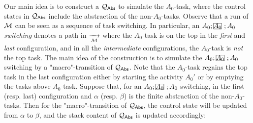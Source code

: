 Our main idea is to construct a {\WOTrPDS} ${\mathcal{Q} }_{{\mathsf{Abs} }}$ to simulate the $A_0$-task, where the control states in ${\mathcal{Q} }_{{\mathsf{Abs} }}$ include the abstraction of the non-$A_0$-tasks.
Observe that a run of ${\mathcal{M} }$ can be seen as a sequence of task switching. In particular, an $A_0;\mhcancel{A_0};A_0$ \emph{switching} denotes a path in $\xrightarrow[{\mathcal{M} }]{}$ where the $A_0$-task is on the top in the \emph{first} and \emph{last} configuration, and in all the \emph{intermediate} configurations, the $A_0$-task is \emph{not} the top task. The main idea of the construction is to simulate the $A_0;\mhcancel{A_0};A_0$ switching by a "macro"-transition of ${\mathcal{Q} }_{{\mathsf{Abs} }}$. Note that the $A_0$-task regains the top task in the last configuration either by starting the activity $A_0'$ or by emptying the tasks above $A_0$-task. Suppose that, for an $A_0;\mhcancel{A_0};A_0$ switching, in the first (resp. last) configuration and $\alpha$ (resp. $\beta$) is the finite abstraction of the non-$A_0$-tasks. Then for the "macro"-transition of ${\mathcal{Q} }_{{\mathsf{Abs} }}$, the control state will be updated from $\alpha$ to $\beta$, and the stack content of ${\mathcal{Q} }_{{\mathsf{Abs} }}$ is updated accordingly:

